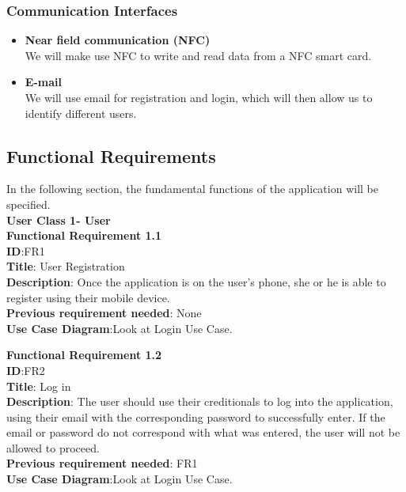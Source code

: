 \documentclass[english]{article}
\begin{document}
						\subsubsection{Communication Interfaces}
						\begin{itemize}
    						    
    						    \item \textbf{Near field communication (NFC)} \\
    						    We will make use NFC to write and read data from a NFC smart card.    						    
    						  
    						    \item \textbf{E-mail} \\
    						    We will use email for registration and login, which will then allow us to identify different users.  \\
    						\end{itemize}

 				\subsection{Functional Requirements}
				In the following section, the fundamental functions of the application will be specified.\\
				\textbf{User Class 1- User}\\
				\textbf{Functional Requirement 1.1}\\
				\textbf{ID}:FR1\\
				\textbf{Title}: User Registration\\
				\textbf{Description}: Once the application is on the user's phone, she or he is able to register using their mobile device.\\
				\textbf{Previous requirement needed}: None\\
				\textbf{Use Case Diagram}:Look at Login Use Case. 
				
				\textbf{Functional Requirement 1.2}\\
				\textbf{ID}:FR2\\
				\textbf{Title}: Log in\\
				\textbf{Description}: The user should use their creditionals to log into the application, using their email with the corresponding password to successfully enter. If the email or password do not correspond with what was entered, the user will not be allowed to proceed.\\
				\textbf{Previous requirement needed}: FR1\\
				\textbf{Use Case Diagram}:Look at Login Use Case.
				
\end{document}
